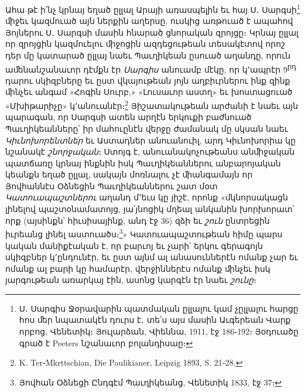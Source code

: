 \documentclass{article}
\begin{document}
{Ահա թէ ի՛նչ կրնայ եղած ըլլալ Արայի առասպելին եւ հայ Ս․ Սարգսի\footnote{Ս․ Սարգիս Ջօրավարին պատմական ըլլալու կամ չըլլալու հարցը հոս ﬔր նպատակէն դուրս է․ տե՛ս այս մասին Աւգերեան Վարք որբոց, Վենետիկ։ Յուլարձան, Վիեննա, 1911, էջ 186֊192։ Յօդուածը գրած է Peeters նշանաւոր բոլանդիսաը։} ﬕջեւ կազմուած այն ներքին աղերսը, ուսկից առթուած է ապահով Յոյներու Ս․ Սարգսի մասին հնարած ցնորական զրոյցը։ Կրնայ ըլլալ որ զրոյցին կազմուելու ﬕջոցին ազդեցութեան տեսակէտով որոշ դեր մը կատարած ըլլայ նաեւ Պաւղիկեան ըսուած աղանդը, որուն աﬔնանշանաւոր դէմքն էր \emph{Սարգիս} անուամբ մէկը, որ կ՚ապրէր 9\textsuperscript{րդ} դարու սկիզբները եւ ըստ վկայութեան յոյն աղբիւրներու ինք զինք ﬕնչեւ անգամ «Հոգին Սուրբ,» «Լուսաւոր աստղ» եւ խոստացուած «Մխիթարիչը» կ՚անուանէր։\footnote{K. Ter֊Mkrttschian, Die Paulikianer, Leipzig 1893, S. 21֊28.} Յիշատակութեան արժանի է նաեւ այն պարագան, որ Սարգսի ատեն արղէն երկուքի բաժնուած Պաւղիկեանները՝ իր մահուընէն վերջը ժամանակ մը սկսան նաեւ \emph{Կիւնոխորենտներ} եւ Աստադներ անուանուիլ, արդ Կիւնոխորիա կը նշանակէ \emph{շնորջական}։ Ստոյգ է, անուանակոչութեանս անﬕջական պատճառը կրնայ ինքնին իսկ Պաւղիկեաններու անբարոյական կեանքն եղած ըլլալ, սակայն մոռնալու չէ ﬕանգամայն որ Յովհաննէս Օձնեցին Պաւղիկեաններու շատ մօտ \emph{Կատուապաշտներու} աղանդ մ՚եւս կը յիշէ, որոնք «մկնորսակացն լինելով պաշտօնամատոյց, յա՛յնոցիկ մղեալ անկանին խորխորատ՝ որք (այսինքն՝ հիւսիսայինք, անդ էջ 36) զձի եւ \emph{շուն} ընտրեցին իւրեանց լինել աստուածս։\footnote{Յովհան Օձնեցի Ընդգէմ Պաւղիկեանց, Վենետիկ 1833, էջ 37։}» Կատուապաշտութեան հիմը պարս կական մանիքէական է, որ բարւոյ եւ չարի՝ երկու գերագոյն սկիզբներ կ՚ընդունէր, եւ ըստ այնմ ալ անասուններէն ոմանք չար եւ ոմանք ալ բարի կը համարէր, վերջիններէս ոմանք ﬕնչեւ իսկ յարգութեան առարկայ էին, ասոնց կարգէն էր նաեւ \emph{շունը}։

}
\end{document}
